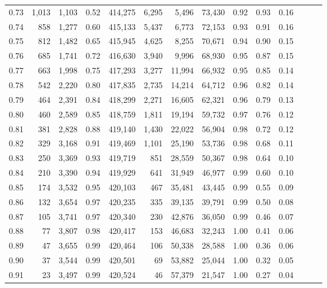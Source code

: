 \begin{tabular}{rrrrrrrrrrrrrr}
0.73 &  1,013 &  1,103 &  0.52 &  414,275 &    6,295 &   5,496 &  73,430 &  0.92 &  0.93 &      0.16 \\
0.74 &    858 &  1,277 &  0.60 &  415,133 &    5,437 &   6,773 &  72,153 &  0.93 &  0.91 &      0.16 \\
0.75 &    812 &  1,482 &  0.65 &  415,945 &    4,625 &   8,255 &  70,671 &  0.94 &  0.90 &      0.15 \\
0.76 &    685 &  1,741 &  0.72 &  416,630 &    3,940 &   9,996 &  68,930 &  0.95 &  0.87 &      0.15 \\
0.77 &    663 &  1,998 &  0.75 &  417,293 &    3,277 &  11,994 &  66,932 &  0.95 &  0.85 &      0.14 \\
0.78 &    542 &  2,220 &  0.80 &  417,835 &    2,735 &  14,214 &  64,712 &  0.96 &  0.82 &      0.14 \\
0.79 &    464 &  2,391 &  0.84 &  418,299 &    2,271 &  16,605 &  62,321 &  0.96 &  0.79 &      0.13 \\
0.80 &    460 &  2,589 &  0.85 &  418,759 &    1,811 &  19,194 &  59,732 &  0.97 &  0.76 &      0.12 \\
0.81 &    381 &  2,828 &  0.88 &  419,140 &    1,430 &  22,022 &  56,904 &  0.98 &  0.72 &      0.12 \\
0.82 &    329 &  3,168 &  0.91 &  419,469 &    1,101 &  25,190 &  53,736 &  0.98 &  0.68 &      0.11 \\
0.83 &    250 &  3,369 &  0.93 &  419,719 &      851 &  28,559 &  50,367 &  0.98 &  0.64 &      0.10 \\
0.84 &    210 &  3,390 &  0.94 &  419,929 &      641 &  31,949 &  46,977 &  0.99 &  0.60 &      0.10 \\
0.85 &    174 &  3,532 &  0.95 &  420,103 &      467 &  35,481 &  43,445 &  0.99 &  0.55 &      0.09 \\
0.86 &    132 &  3,654 &  0.97 &  420,235 &      335 &  39,135 &  39,791 &  0.99 &  0.50 &      0.08 \\
0.87 &    105 &  3,741 &  0.97 &  420,340 &      230 &  42,876 &  36,050 &  0.99 &  0.46 &      0.07 \\
0.88 &     77 &  3,807 &  0.98 &  420,417 &      153 &  46,683 &  32,243 &  1.00 &  0.41 &      0.06 \\
0.89 &     47 &  3,655 &  0.99 &  420,464 &      106 &  50,338 &  28,588 &  1.00 &  0.36 &      0.06 \\
0.90 &     37 &  3,544 &  0.99 &  420,501 &       69 &  53,882 &  25,044 &  1.00 &  0.32 &      0.05 \\
0.91 &     23 &  3,497 &  0.99 &  420,524 &       46 &  57,379 &  21,547 &  1.00 &  0.27 &      0.04 \\

\end{tabular}
